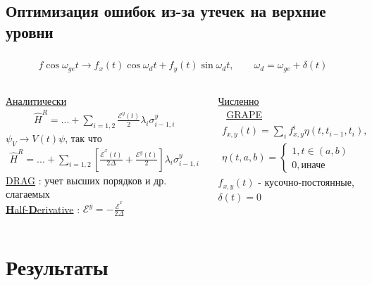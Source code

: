 \documentclass[aspectratio=169, 13pt]{beamer}
\begin{document}
\subsection{Оптимизация ошибок из-за утечек на верхние уровни}
\begin{frame}[c]\frametitle{\secname}\framesubtitle{\subsecname}


\begin{gather*}
f \cos \omega_{ge} t \longrightarrow f_x(t) \cos \omega_d t  + f_y(t) \sin \omega_d t,\quad \quad
\omega_d = \omega_{ge} + \delta(t)  
\end{gather*}

\begin{columns}[c]
\centering
\underline{Аналитически}
\vspace{-0.2cm}
\begin{gather*}
\hat{H}^R = ... + \sum_{i = 1,2} \frac{\mathcal{E}^y(t)}{2} \lambda_i \sigma^y_{i-1,i} 
\end{gather*}
$\psi_V \rightarrow V(t) \psi$, так что
\begin{gather*}
\hat{H}^R = ... + \sum_{i = 1,2} \left[\frac{\dot{\mathcal{E}}^x(t)}{2 \Delta} +   \frac{\mathcal{E}^y(t)}{2 } \right] \lambda_i \sigma^y_{i-1,i} 
\end{gather*}
\underline{DRAG} : учет высших порядков и др. слагаемых\\
\underline{\textbf{H}alf-\textbf{D}erivative} : $\mathcal{E}^y = - \frac{\dot{\mathcal{E}}^x}{2 \Delta}$
\centering
\vspace{-0.2cm}

\underline{Численно}
\\\
\vskip 0.01cm
\underline{GRAPE}
\begin{gather*}
f_{x,y}(t) = \sum_i f_{x,y}^i \eta(t,t_{i-1},t_i),\\
\eta(t,a,b) = 
	\begin{cases}
		1, t \in \left( a, b \right) \\
		0,  \text{иначе}
	\end{cases}
\end{gather*}
$f_{x,y}(t)$ - кусочно-постоянные,
\newline
$\delta(t) = 0$
\end{columns}
\end{frame}


\section{Результаты}
\end{document}
